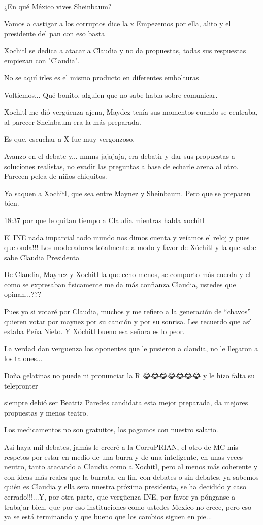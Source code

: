 ¿En qué México vives Sheinbaum?

Vamos a castigar a los corruptos dice la x 
Empezemos por ella, alito y el presidente del pan con eso basta

Xochitl se dedica a atacar a Claudia y no da propuestas, todas sus respuestas empiezan con "Claudia".

No se aquí irles es el mismo producto en diferentes embolturas

Voltiemos... Qué bonito, alguien que no sabe habla sobre comunicar.

Xochitl me dió vergüenza ajena, Maydez tenía sus momentos cuando se centraba, al parecer Sheinbaum era la más preparada.


Es que, escuchar a X fue muy vergonzoso.

Avanzo en el debate y... nmms jajajaja, era debatir y dar sus propuestas a soluciones realistas, no evadir las preguntas a base de echarle arena al otro. Parecen pelea de niños chiquitos.


Ya saquen a Xochitl, que sea entre Maynez y Sheinbaum. Pero que se preparen bien.

18:37 por que le quitan tiempo a Claudia mientras habla xochitl

El INE nada imparcial todo mundo nos dimos cuenta y veíamos el reloj y pues que onda!!! Los moderadores totalmente a modo y favor de Xóchitl  y la que sabe sabe Claudia Presidenta 👏🏻👏🏻👏🏻

De Claudia, Maynez y Xochitl la que echo menos, se comporto más cuerda y el como se expresaban fisicamente me da más confianza Claudia, ustedes que opinan...???

Pues yo si votaré por Claudia, muchos y me refiero a la generación de “chavos” quieren votar por maynez por su canción y por su sonrisa. Les recuerdo que así estaba Peña Nieto. Y Xóchitl bueno esa señora es lo peor.

La verdad dan verguenza los oponentes que le pusieron a claudia, no le llegaron a los talones...

Doña gelatinas no puede ni pronunciar la R 😂😂😂😂😂😂😂 y le hizo falta su telepronter

siempre debió ser Beatriz Paredes candidata esta mejor preparada, da mejores propuestas y menos teatro.

Los medicamentos no son gratuitos, los pagamos con nuestro salario.

Asi haya mil debates, jamás le creeré a la CorruPRIAN, el otro de MC mis respetos por estar en medio de una burra y de una inteligente, en unas veces neutro, tanto atacando a Claudia como a Xochitl, pero al menos más coherente y con ideas más reales que la burrata, en fin, con debates o sin debates, ya sabemos quién es Claudia y ella sera nuestra próxima presidenta, se ha decidido y caso cerrado!!!...Y, por otra parte, que vergüenza INE, por favor ya pónganse a trabajar bien, que por eso instituciones como ustedes Mexico no crece, pero eso ya se está terminando y que bueno que los cambios siguen en pie...

